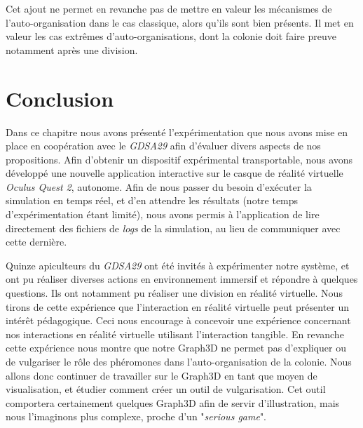	Cet ajout ne permet en revanche pas de mettre en valeur les mécanismes de l'auto-organisation dans le cas classique, alors qu'ils sont bien présents. Il met en valeur les cas extrêmes d'auto-organisations, dont la colonie doit faire preuve notamment après une division.
			
	\section*{Conclusion}
	Dans ce chapitre nous avons présenté l'expérimentation que nous avons mise en place en coopération avec le \textit{GDSA29} afin d'évaluer divers aspects de nos propositions. Afin d'obtenir un dispositif expérimental transportable, nous avons développé une nouvelle application interactive sur le casque de réalité virtuelle \textit{Oculus Quest 2}, autonome. Afin de nous passer du besoin d'exécuter la simulation en temps réel, et d'en attendre les résultats (notre temps d'expérimentation étant limité), nous avons permis à l'application de lire directement des fichiers de \textit{logs} de la simulation, au lieu de communiquer avec cette dernière.
	
	Quinze apiculteurs du \textit{GDSA29} ont été invités à expérimenter notre système, et ont pu réaliser diverses actions en environnement immersif et répondre à quelques questions. Ils ont notamment pu réaliser une division en réalité virtuelle. Nous tirons de cette expérience que l'interaction en réalité virtuelle peut présenter un intérêt pédagogique. Ceci nous encourage à concevoir une expérience concernant nos interactions en réalité virtuelle utilisant l'interaction tangible. En revanche cette expérience nous montre que notre Graph3D ne permet pas d'expliquer ou de vulgariser le rôle des phéromones dans l'auto-organisation de la colonie. Nous allons donc continuer de travailler sur le Graph3D en tant que moyen de visualisation, et étudier comment créer un outil de vulgarisation. Cet outil comportera certainement quelques Graph3D afin de servir d'illustration, mais nous l'imaginons plus complexe, proche d'un "\textit{serious game}".